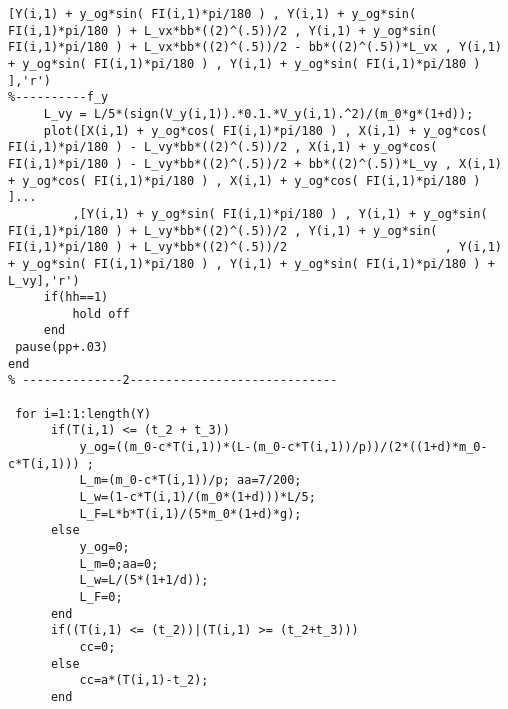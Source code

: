 \documentclass[UTF8]{article}
\begin{document}
\begin{appendix}
\begin{lstlisting}[title=main.m, frame=shadowbox]
         [Y(i,1) + y_og*sin( FI(i,1)*pi/180 ) , Y(i,1) + y_og*sin( FI(i,1)*pi/180 ) + L_vx*bb*((2)^(.5))/2 , Y(i,1) + y_og*sin( FI(i,1)*pi/180 ) + L_vx*bb*((2)^(.5))/2 - bb*((2)^(.5))*L_vx , Y(i,1) + y_og*sin( FI(i,1)*pi/180 ) , Y(i,1) + y_og*sin( FI(i,1)*pi/180 )       ],'r')
%----------f_y
     L_vy = L/5*(sign(V_y(i,1)).*0.1.*V_y(i,1).^2)/(m_0*g*(1+d));
     plot([X(i,1) + y_og*cos( FI(i,1)*pi/180 ) , X(i,1) + y_og*cos( FI(i,1)*pi/180 ) - L_vy*bb*((2)^(.5))/2 , X(i,1) + y_og*cos( FI(i,1)*pi/180 ) - L_vy*bb*((2)^(.5))/2 + bb*((2)^(.5))*L_vy , X(i,1) + y_og*cos( FI(i,1)*pi/180 ) , X(i,1) + y_og*cos( FI(i,1)*pi/180 )       ]...
         ,[Y(i,1) + y_og*sin( FI(i,1)*pi/180 ) , Y(i,1) + y_og*sin( FI(i,1)*pi/180 ) + L_vy*bb*((2)^(.5))/2 , Y(i,1) + y_og*sin( FI(i,1)*pi/180 ) + L_vy*bb*((2)^(.5))/2                      , Y(i,1) + y_og*sin( FI(i,1)*pi/180 ) , Y(i,1) + y_og*sin( FI(i,1)*pi/180 ) + L_vy],'r')
     if(hh==1)
         hold off
     end
 pause(pp+.03)
end
% --------------2-----------------------------   

 for i=1:1:length(Y)
      if(T(i,1) <= (t_2 + t_3)) 
          y_og=((m_0-c*T(i,1))*(L-(m_0-c*T(i,1))/p))/(2*((1+d)*m_0-c*T(i,1))) ;     
          L_m=(m_0-c*T(i,1))/p; aa=7/200;
          L_w=(1-c*T(i,1)/(m_0*(1+d)))*L/5;
          L_F=L*b*T(i,1)/(5*m_0*(1+d)*g);
      else
          y_og=0;
          L_m=0;aa=0;
          L_w=L/(5*(1+1/d));
          L_F=0;               
      end
      if((T(i,1) <= (t_2))|(T(i,1) >= (t_2+t_3))) 
          cc=0;
      else 
          cc=a*(T(i,1)-t_2);
      end
     

\end{lstlisting}
\end{appendix}
\end{document}
